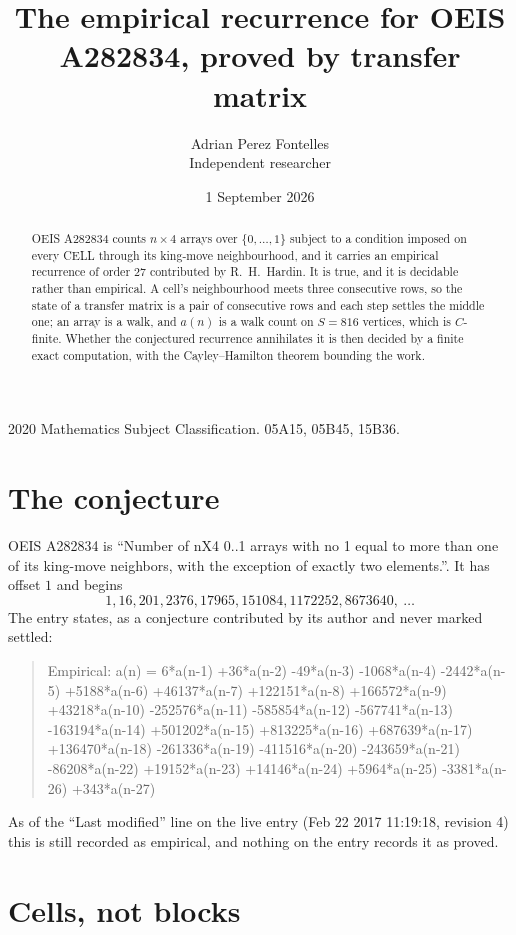 \documentclass[11pt,a4paper]{article}
\title{The empirical recurrence for OEIS A282834, proved by transfer matrix}
\author{Adrian Perez Fontelles\\ \small Independent researcher}
\date{1 September 2026}
\theoremstyle{plain}
\theoremstyle{definition}
\begin{document}
\maketitle

\begin{abstract}
OEIS A282834 counts $n\times4$ arrays over $\{0,\dots,1\}$ subject to a condition imposed on
every CELL through its king-move neighbourhood, and it carries an empirical recurrence of
order $27$ contributed by R.~H.~Hardin. It is true, and it is decidable rather than
empirical. A cell's neighbourhood meets three consecutive rows, so the state of a transfer
matrix is a pair of consecutive rows and each step settles the middle one; an array is a
walk, and $a(n)$ is a walk count on $S=816$ vertices, which is $C$-finite. Whether the
conjectured recurrence annihilates it is then decided by a finite exact computation, with the
Cayley--Hamilton theorem bounding the work.
\end{abstract}

\noindent\small 2020 Mathematics Subject Classification. 05A15, 05B45, 15B36.\normalsize

\section{The conjecture}

OEIS A282834 is ``Number of nX4 0..1 arrays with no 1 equal to more than one of its king-move neighbors, with the exception of exactly two elements.''. It has offset $1$ and begins
\[
1, 16, 201, 2376, 17965, 151084, 1172252, 8673640,\ \dots
\]
The entry states, as a conjecture contributed by its author and never marked settled:
\begin{quote}
Empirical: a(n) = 6*a(n-1) +36*a(n-2) -49*a(n-3) -1068*a(n-4) -2442*a(n-5) +5188*a(n-6) +46137*a(n-7) +122151*a(n-8) +166572*a(n-9) +43218*a(n-10) -252576*a(n-11) -585854*a(n-12) -567741*a(n-13) -163194*a(n-14) +501202*a(n-15) +813225*a(n-16) +687639*a(n-17) +136470*a(n-18) -261336*a(n-19) -411516*a(n-20) -243659*a(n-21) -86208*a(n-22) +19152*a(n-23) +14146*a(n-24) +5964*a(n-25) -3381*a(n-26) +343*a(n-27)
\end{quote}
As of the ``Last modified'' line on the live entry (Feb 22 2017 11:19:18, revision 4) this is still
recorded as empirical, and nothing on the entry records it as proved.

\section{Cells, not blocks}
\end{document}
